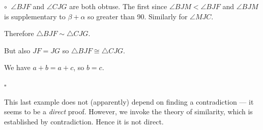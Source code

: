 \documentclass[11pt, oneside]{article}
\begin{document}
$\circ \ $ $\angle BJF$ and $\angle CJG$ are both obtuse.  The first since $\angle BJM < \angle BJF$ and $\angle BJM$ is supplementary to $\beta + \alpha$ so greater than 90.  Similarly for $\angle MJC.$

Therefore $\triangle BJF \sim \triangle CJG$.

But also $JF = JG$ so $\triangle BJF \cong \triangle CJG$.

We have $a + b = a + c$, so $b = c$.

$\square$

This last example does not (apparently) depend on finding a contradiction --- it seems to be a \emph{direct} proof.  However, we invoke the theory of similarity, which is established by contradiction.  Hence it is not direct.  
\end{document}

